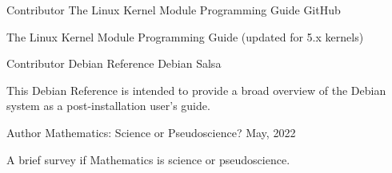 

\begin{cventries}

  \cventry
  {Contributor} %
  {The Linux Kernel Module Programming Guide} %
  {GitHub} %
  {} %
  {
    \begin{cvitems} %
      \item {The Linux Kernel Module Programming Guide (updated for 5.x kernels)}
    \end{cvitems}
  }

  \cventry
  {Contributor} %
  {Debian Reference} %
  {Debian Salsa} %
  {} %
  {
    \begin{cvitems} %
      \item {This Debian Reference is intended to provide a broad overview of the Debian system as a post-installation user's guide.}
    \end{cvitems}
  }

  \cventry
  {Author} %
  {Mathematics: Science or Pseudoscience?} %
  {} %
  {May, 2022} %
  {
    \begin{cvitems} %
      \item {A brief survey if Mathematics is science or pseudoscience.}
    \end{cvitems}
  }

\end{cventries}
